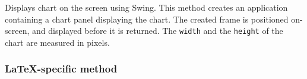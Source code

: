 \begin{tabb}
   Displays chart on the screen using Swing.
   This method creates an application containing a chart panel displaying
   the chart.  The created frame is positioned on-screen, and displayed before
   it is returned. The \texttt{width} and the \texttt{height}
   of the chart are measured in pixels.
\end{tabb}
\begin{htmlonly}
\end{htmlonly}

\subsubsection*{\LaTeX-specific method}

